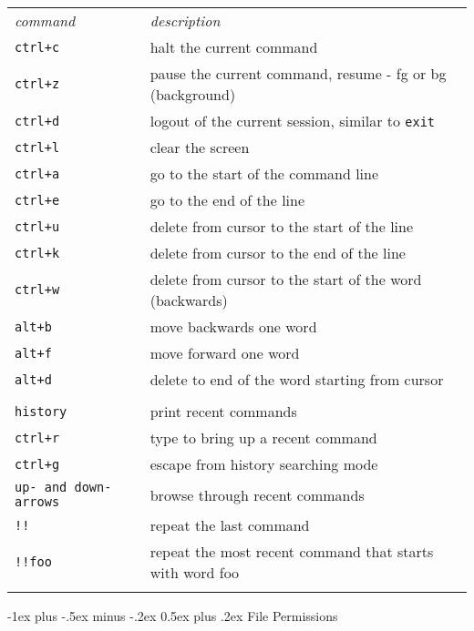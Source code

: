 \documentclass[10pt,landscape]{article}
\makeatletter
\renewcommand{\section}{\@startsection{section}{1}{0mm}%
                                {-1ex plus -.5ex minus -.2ex}%
                                {0.5ex plus .2ex}%
                                {\normalfont\large\bfseries}}
\makeatother
\begin{document}
\begin{multicols}{2}
\begin{tabular}{ll}
\emph{command} & \emph{description} \\
\texttt{ctrl+c} & halt the current command\\
\texttt{ctrl+z} & pause the current command, resume - fg or bg (background)\\
\texttt{ctrl+d} & logout of the current session, similar to \texttt{exit}\\
\texttt{ctrl+l} & clear the screen\\
\texttt{ctrl+a} & go to the start of the command line\\
\texttt{ctrl+e} & go to the end of the line\\
\texttt{ctrl+u} & delete from cursor to the start of the line\\
\texttt{ctrl+k} & delete from cursor to the end of the line\\
\texttt{ctrl+w} & delete from cursor to the start of the word (backwards)\\
\texttt{alt+b} & move backwards one word\\
\texttt{alt+f} & move forward one word\\
\texttt{alt+d} & delete to end of the word starting from cursor\\
\\
\texttt{history} & print recent commands\\
\texttt{ctrl+r} & type to bring up a recent command\\
\texttt{ctrl+g} & escape from history searching mode\\
\texttt{up- and down-arrows} & browse through recent commands\\
\texttt{!!} & repeat the last command\\
\texttt{!!foo} & repeat the most recent command that starts with word foo\\

\\
\end{tabular}





\section{File Permissions}
\begin{tabular}{ll}


\end{tabular}
\end{multicols}
\end{document}
